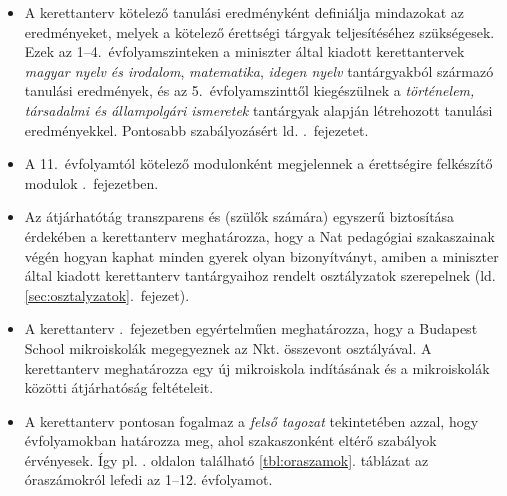 \begin{itemize}
      \item A kerettanterv kötelező tanulási eredményként definiálja mindazokat
            az
            eredményeket, melyek a kötelező érettségi tárgyak teljesítéséhez
            szükségesek. Ezek az 1--4.~évfolyamszinteken a miniszter által
            kiadott
            kerettantervek
            \emph{magyar nyelv és irodalom}, \emph{matematika}, \emph{idegen
                  nyelv}
            tantárgyakból
            származó tanulási eredmények, és az 5.~évfolyamszinttől kiegészülnek a
            \emph{történelem, társadalmi és állampolgári ismeretek} tantárgyak
            alapján
            létrehozott tanulási eredményekkel. Pontosabb szabályozásért ld.
            .~fejezetet.
      \item A 11.~évfolyamtól kötelező modulonként megjelennek a érettségire
            felkészítő
            modulok .~fejezetben.
      \item Az átjárhatótág transzparens és (szülők számára) egyszerű biztosítása
            érdekében a
            kerettanterv meghatározza, hogy a Nat pedagógiai szakaszainak végén
            hogyan
            kaphat minden gyerek olyan bizonyítványt, amiben
            a miniszter által kiadott kerettanterv
            tantárgyaihoz rendelt osztályzatok szerepelnek
            (ld. \ref{sec:osztalyzatok}.~fejezet).
      \item A kerettanterv .~fejezetben egyértelműen
            meghatározza, hogy a Budapest School mikroiskolák
            megegyeznek az Nkt. összevont osztályával. A kerettanterv
            meghatározza egy új mikroiskola
            indításának és a mikroiskolák közötti átjárhatóság feltételeit.
      \item A kerettanterv pontosan fogalmaz a \emph{felső tagozat} tekintetében
            azzal, hogy évfolyamokban határozza meg, ahol szakaszonként eltérő
            szabályok
            érvényesek. Így pl. . oldalon található
            \ref{tbl:oraszamok}. táblázat
            az óraszámokról lefedi az 1--12. évfolyamot.


\end{itemize}
